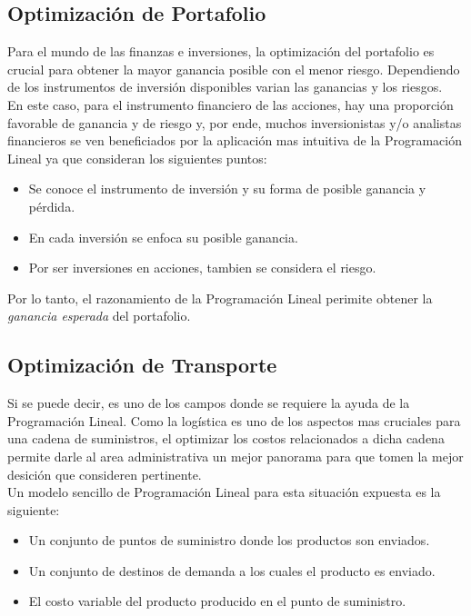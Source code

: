 \documentclass[letterpaper, 12pt]{article}
\begin{document}
        \subsection{Optimización de Portafolio}
        \justify
        Para el mundo de las finanzas e inversiones, la optimización del portafolio es crucial para obtener la mayor ganancia posible con el menor riesgo. Dependiendo de los
        instrumentos de inversión disponibles varian las ganancias y los riesgos. \\ \newline
        En este caso, para el instrumento financiero de las acciones, hay una proporción favorable de ganancia y de riesgo y, por ende, muchos inversionistas y/o analistas financieros
        se ven beneficiados por la aplicación mas intuitiva de la Programación Lineal ya que consideran los siguientes puntos:
        \begin{itemize}
            \item Se conoce el instrumento de inversión y su forma de posible ganancia y pérdida.
            \item En cada inversión se enfoca su posible ganancia.
            \item Por ser inversiones en acciones, tambien se considera el riesgo.
        \end{itemize}
        Por lo tanto, el razonamiento de la Programación Lineal perimite obtener la \emph{ganancia esperada} del portafolio.
        \subsection{Optimización de Transporte}
        \justify
        Si se puede decir, es uno de los campos donde se requiere la ayuda de la Programación Lineal. Como la logística es uno de los aspectos mas cruciales para una cadena de suministros, el optimizar
        los costos relacionados a dicha cadena permite darle al area administrativa un mejor panorama para que tomen la mejor desición que consideren pertinente. 
        \\ \newline
        Un modelo sencillo de Programación Lineal para esta situación expuesta es la siguiente:
        \begin{itemize}
            \item Un conjunto de puntos de suministro donde los productos son enviados.
            \item Un conjunto de destinos de demanda a los cuales el producto es enviado.
            \item El costo variable del producto producido en el punto de suministro.
        \end{itemize} 
\end{document}

